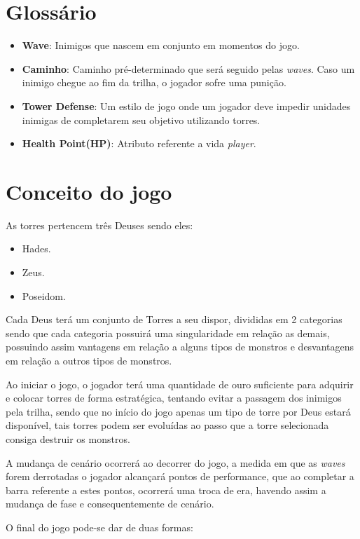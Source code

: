 \documentclass[11pt]{article} %
\begin{document}
\section{Glossário}
\begin{itemize}
\item \textbf{Wave}: Inimigos que nascem em conjunto em momentos do jogo.
\item \textbf{Caminho}: Caminho pré-determinado que será seguido pelas \textit{waves}. Caso um inimigo chegue ao fim da trilha, o jogador sofre uma punição.
\item \textbf{Tower Defense}: Um estilo de jogo onde um jogador deve impedir unidades inimigas de completarem seu objetivo utilizando torres.
\item \textbf{Health Point(HP)}: Atributo referente a vida \textit{player}.
\end{itemize}
 
\section{Conceito do jogo}

As torres pertencem  três Deuses sendo eles:
\begin{itemize}
\item Hades.
\item Zeus.
\item Poseidom.
\end{itemize}

Cada Deus terá um conjunto de Torres a seu dispor, divididas em 2 categorias sendo que cada categoria possuirá uma singularidade em relação as demais, possuindo assim vantagens em relação a alguns tipos de monstros e desvantagens em relação a outros tipos de monstros.

Ao iniciar o jogo, o jogador terá uma quantidade de ouro suficiente para adquirir e colocar torres de forma estratégica, tentando evitar a passagem dos inimigos pela trilha, sendo que no início do jogo apenas um tipo de torre por Deus estará disponível, tais torres podem ser evoluídas ao passo que a torre selecionada consiga destruir os monstros. 

A mudança de cenário ocorrerá ao decorrer do jogo, a medida em que as \textit{waves} forem derrotadas o jogador alcançará pontos de performance, que ao completar a barra referente a estes pontos, ocorrerá uma troca de era, havendo assim a mudança de fase e consequentemente de cenário. 

O final do jogo pode-se dar de duas formas:
\end{document}
